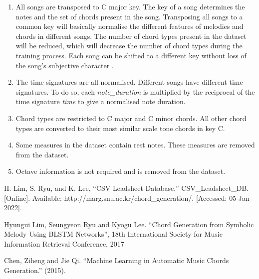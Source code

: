 \documentclass[11pt]{article}
\begin{document}
\begin{enumerate}
  \item All songs are transposed to C major key. The key of a song determines the notes and the set of chords present in the song. Transposing all songs to a common key will basically normalise the different features of melodies and chords in different songs. The number of chord types present in the dataset will be reduced, which will decrease the number of chord types during the training process. Each song can be shifted to a different key without loss of the song's subjective character \cite{paper2}.
  \item The time signatures are all normalised. Different songs have different time signatures. To do so, each \emph{note\_duration} is multiplied by the reciprocal of the time signature \emph{time} to give a normalised note duration.
  \item Chord types are restricted to C major and C minor chords. All other chord types are converted to their most similar scale tone chords in key C.
  \item Some measures in the dataset contain rest notes. These measures are removed from the dataset.
  \item Octave information is not required and is removed from the dataset.
\end{enumerate}


\begin{thebibliography}{9}

    H. Lim, S. Ryu, and K. Lee, “CSV Leadsheet Database,” CSV\_Leadsheet\_DB. [Online]. Available: http://marg.snu.ac.kr/chord\_generation/. [Accessed: 05-Jan-2022]. 
   
    Hyungui Lim, Seungyeon Ryu and Kyogu Lee. “Chord Generation from Symbolic Melody Using BLSTM Networks”, 18th International Society for Music Information Retrieval Conference, 2017
    
    Chen, Ziheng and Jie Qi. “Machine Learning in Automatic Music Chords Generation.” (2015).

    \end{thebibliography}
\end{document}
